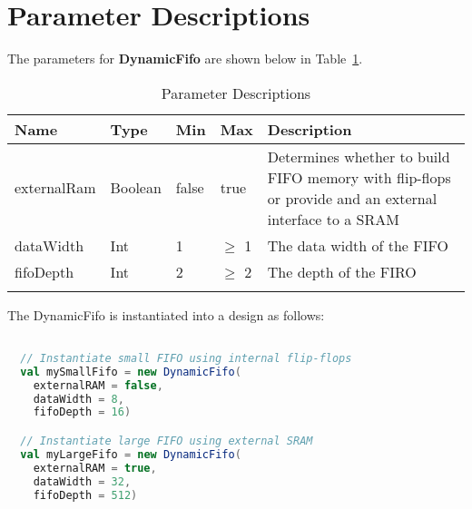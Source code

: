 
\section{Parameter Descriptions}

The parameters for \textbf{DynamicFifo} are shown below in
Table~\ref{table:params}.

\renewcommand*{\arraystretch}{1.4}
\begin{longtable}[H]{
    | p{}
    | p{}
    | p{}
    | p{}
    | p{} |
  }
  \hline
  \textbf{Name} &
  \textbf{Type} &
  \textbf{Min}  &
  \textbf{Max}  &
  \textbf{Description}            \\ \hline \hline

  externalRam   &
  Boolean       &
  false         &
  true          &
  Determines whether to build FIFO memory with flip-flops or provide and
  an external interface to a SRAM \\ \hline

  dataWidth     &
  Int           &
  1             &
  $\ge$ 1       &
  The data width of the FIFO      \\ \hline

  fifoDepth     &
  Int           &
  2             &
  $\ge$ 2       &
  The depth of the FIRO           \\ \hline

  \caption{Parameter Descriptions}\label{table:params}
\end{longtable}

The DynamicFifo is instantiated into a design as follows:

\begin{lstlisting}[language=Scala]

  // Instantiate small FIFO using internal flip-flops
  val mySmallFifo = new DynamicFifo(
    externalRAM = false, 
    dataWidth = 8, 
    fifoDepth = 16) 

  // Instantiate large FIFO using external SRAM
  val myLargeFifo = new DynamicFifo(
    externalRAM = true, 
    dataWidth = 32, 
    fifoDepth = 512) 

  \end{lstlisting}